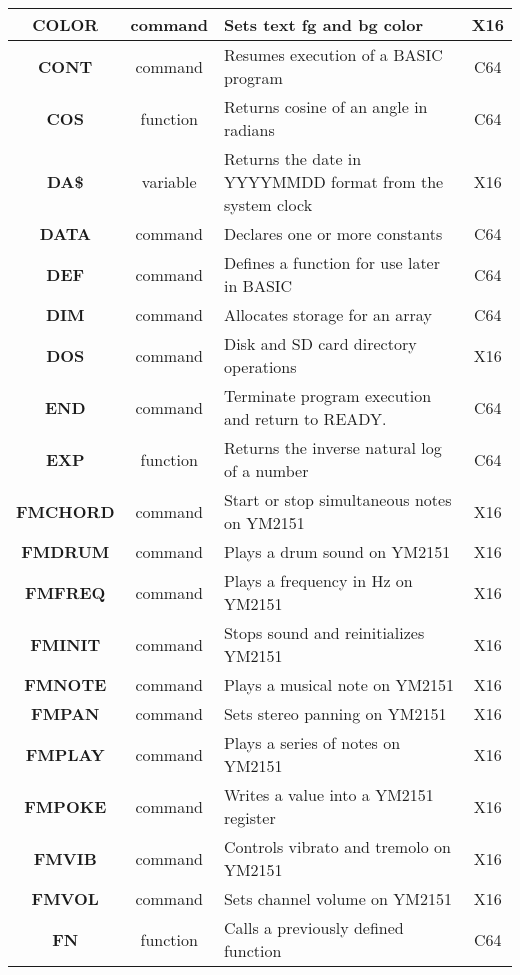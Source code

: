 \begin{longtable}{|c|c|m{4cm}|c|}
	{\bfseries COLOR} & command & Sets text fg and bg color & X16 \\ \hline
	{\bfseries CONT} & command & Resumes execution of a BASIC program & C64 \\ \hline
	{\bfseries COS} & function & Returns cosine of an angle in radians & C64 \\ \hline
	{\bfseries DA\$} & variable & Returns the date in YYYYMMDD format from the system clock & X16 \\ \hline
	{\bfseries DATA} & command & Declares one or more constants & C64 \\ \hline
	{\bfseries DEF} & command & Defines a function for use later in BASIC & C64 \\ \hline
	{\bfseries DIM} & command & Allocates storage for an array & C64 \\ \hline
	{\bfseries DOS} & command & Disk and SD card directory operations & X16 \\ \hline
	{\bfseries END} & command & Terminate program execution and return to {\ttfamily READY.} & C64 \\ \hline
	{\bfseries EXP} & function & Returns the inverse natural log of a number & C64 \\ \hline
	{\bfseries FMCHORD} & command & Start or stop simultaneous notes on YM2151 & X16 \\ \hline
	{\bfseries FMDRUM} & command & Plays a drum sound on YM2151 & X16 \\ \hline
	{\bfseries FMFREQ} & command & Plays a frequency in Hz on YM2151 & X16 \\ \hline
	{\bfseries FMINIT} & command & Stops sound and reinitializes YM2151 & X16 \\ \hline
	{\bfseries FMNOTE} & command & Plays a musical note on YM2151 & X16 \\ \hline
	{\bfseries FMPAN} & command & Sets stereo panning on YM2151 & X16 \\ \hline
	{\bfseries FMPLAY} & command & Plays a series of notes on YM2151 & X16 \\ \hline
	{\bfseries FMPOKE} & command & Writes a value into a YM2151 register & X16 \\ \hline
	{\bfseries FMVIB} & command & Controls vibrato and tremolo on YM2151 & X16 \\ \hline
	{\bfseries FMVOL} & command & Sets channel volume on YM2151 & X16 \\ \hline
	{\bfseries FN} & function & Calls a previously defined function & C64 \\ \hline

\end{longtable}
